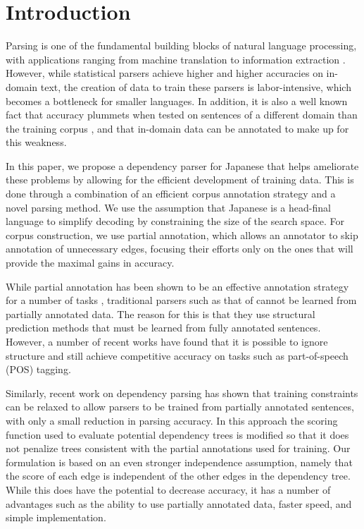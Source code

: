 \documentclass[english]{jnlp_1.4}
\begin{document}
\maketitle

\section{Introduction}
\label{sec:introduction}

Parsing is one of the fundamental building blocks of natural language processing, with applications
ranging from machine translation \cite{yamada01syntaxbasedmt} to information extraction
\cite{miyao09interactionextraction}.  However, while statistical parsers achieve higher and higher
accuracies on in-domain text, the creation of data to train these parsers is labor-intensive, which
becomes a bottleneck for smaller languages.  In addition, it is also a well known fact that accuracy
plummets when tested on sentences of a different domain than the training corpus
\cite{gildea2001corpus,petrov2010uptraining}, and that in-domain data can be annotated to make up for
this weakness.

In this paper, we propose a dependency parser for Japanese that helps ameliorate
these problems by allowing for the efficient development of training data.  This is done through a
combination of an efficient corpus annotation strategy and a novel parsing method.  We use the
assumption that Japanese is a head-final language to simplify decoding by constraining the size of
the search space.  For corpus construction, we use partial annotation, which allows an annotator to
skip annotation of unnecessary edges, focusing their efforts only on the ones that will provide the
maximal gains in accuracy.

While partial annotation has been shown to be an effective annotation strategy for a number of tasks
\cite{tsuboi2008,sassano2010using,neubig2010}, traditional parsers such as that of
\cite{mcdonald2005non} cannot be learned from partially annotated data. The reason for this is
that they use structural prediction methods that must be learned from fully annotated sentences.
However, a number of recent works \cite{liang08structurecompilation,neubig11aclshort} have found
that it is possible to ignore structure and still achieve competitive accuracy on tasks such as
part-of-speech (POS) tagging. 

Similarly, recent work on dependency parsing \cite{spreyer2009incomplete,spreyer2010training} has
shown that training constraints can be relaxed to allow parsers to be trained from partially
annotated sentences, with only a small reduction in parsing accuracy. In this approach the scoring
function used to evaluate potential dependency trees is modified so that it does not penalize trees
consistent with the partial annotations used for training. Our formulation is based on an even
stronger independence assumption, namely that the score of each edge is independent of the other
edges in the dependency tree. While this does have the potential to decrease accuracy, it has a
number of advantages such as the ability to use partially annotated data, faster speed, and simple
implementation.
\end{document}
